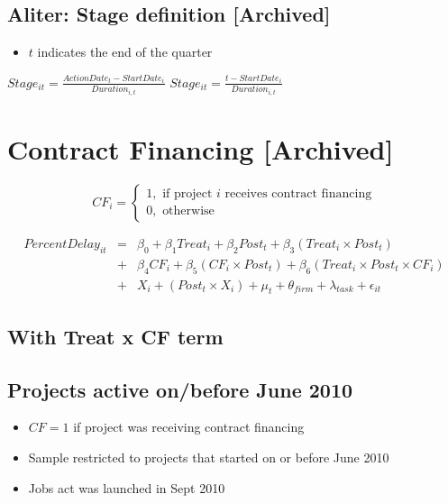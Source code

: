 \documentclass[
]{article}
\providecommand{\tightlist}{%
  \setlength{\itemsep}{0pt}\setlength{\parskip}{0pt}}
\begin{document}
\hypertarget{aliter-stage-definition-archived}{%
\subsection{Aliter: Stage definition
{[}Archived{]}}\label{aliter-stage-definition-archived}}

\begin{itemize}
\tightlist
\item
  \(t\) indicates the end of the quarter
\end{itemize}

\(Stage_{it}=\frac{ActionDate_{t}-StartDate_i}{Duration_{i,t}}\)
\(Stage_{it}=\frac{t-StartDate_i}{Duration_{i,t}}\)

\hypertarget{contract-financing-archived}{%
\section{Contract Financing
{[}Archived{]}}\label{contract-financing-archived}}

\[ CF_i = \begin{cases} 1, \text{ if project } i \text{ receives contract financing}\\
0, \text{ otherwise} \end{cases}\]

\[ \begin{aligned}
PercentDelay_{it} &=& \beta_0+\beta_1 Treat_i + \beta_2 Post_t + \beta_3 (Treat_i \times Post_t) \\
&+&\beta_4 CF_i + \beta_5 (CF_i \times Post_t) + \beta_6 (Treat_i \times Post_t \times CF_i) \\ 
&+&X_i + (Post_t \times X_i) + \mu_t + \theta_{firm} + \lambda_{task}+ \epsilon_{it}
\end{aligned}\]

\hypertarget{with-treat-x-cf-term}{%
\subsection{With Treat x CF term}\label{with-treat-x-cf-term}}

\hypertarget{projects-active-onbefore-june-2010}{%
\subsection{Projects active on/before June
2010}\label{projects-active-onbefore-june-2010}}

\begin{itemize}
\tightlist
\item
  \(CF=1\) if project was receiving contract financing
\item
  Sample restricted to projects that started on or before June 2010
\item
  Jobs act was launched in Sept 2010
\end{itemize}
\end{document}
